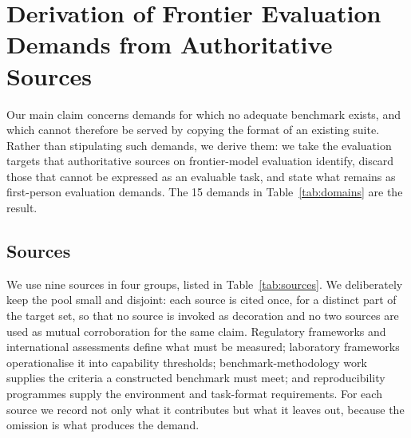 \section{Derivation of Frontier Evaluation Demands from Authoritative Sources}\label{app:derivation-A}

Our main claim concerns demands for which no adequate benchmark exists, and which cannot therefore be served by copying the format of an existing suite. Rather than stipulating such demands, we derive them: we take the evaluation targets that authoritative sources on frontier-model evaluation identify, discard those that cannot be expressed as an evaluable task, and state what remains as first-person evaluation demands. The 15 demands in Table~\ref{tab:domains} are the result.

\subsection{Sources}

We use nine sources in four groups, listed in Table~\ref{tab:sources}. We deliberately keep the pool small and disjoint: each source is cited once, for a distinct part of the target set, so that no source is invoked as decoration and no two sources are used as mutual corroboration for the same claim. Regulatory frameworks and international assessments define what must be measured; laboratory frameworks operationalise it into capability thresholds; benchmark-methodology work supplies the criteria a constructed benchmark must meet; and reproducibility programmes supply the environment and task-format requirements. For each source we record not only what it contributes but what it leaves out, because the omission is what produces the demand.

